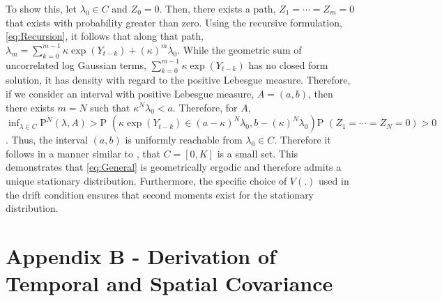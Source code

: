 \documentclass[11pt]{isuthesis}
\begin{document}
To show this, let $\lambda_0 \in C$ and $Z_0=0$.  Then, there exists a path, $Z_1=\cdots=Z_m=0$ that exists with probability greater than zero.  Using the recursive formulation, \eqref{eq:Recursion}, it follows that along that path, $\lambda_m=\sum_{k=0}^{m-1}\kappa\exp(Y_{t-k})+(\kappa)^m \lambda_0$.  While the geometric sum of uncorrelated log Gaussian terms, $\sum_{k=0}^{m-1}\kappa\exp(Y_{t-k})$ has no closed form solution, it has density with regard to the positive Lebesgue measure.  Therefore, if we consider an interval with positive Lebesgue measure, $A=(a,b)$, then there exists $m=N$ such that $\kappa^N \lambda_0<a$.  Therefore, for $A$, $\inf_{\lambda\in C}  \mbox{P}^N(\lambda,A) > \mbox{P }(\kappa\exp(Y_{t-k}) \in (a-\kappa)^N \lambda_0,b-(\kappa)^N \lambda_0)\mbox{P }(Z_1=\cdots=Z_N=0)>0$.  Thus, the interval $(a,b)$ is uniformly reachable from $\lambda_0 \in C$.  Therefore it follows in a manner similar to \cite{fokianos2009poisson}, that $C=[0,K]$ is a small set.  This demonstrates that \eqref{eq:General} is geometrically ergodic and therefore admits a unique stationary distribution.  Furthermore, the specific choice of $V(.)$ used in the drift condition ensures that second moments exist for the stationary distribution.

\section*{Appendix B - Derivation of Temporal and Spatial Covariance}
\end{document}
